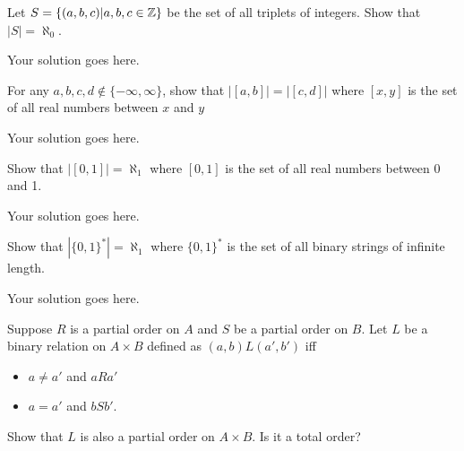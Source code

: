 \documentclass[12pt]{article}
\begin{document}
    \noindent
    
    \onehalfspace

    \begin{question}
        Let $S = \{(a,b,c) | a,b,c \in \mathbb{Z}\}$ be the set of all triplets of integers. Show that $|S| = \aleph_0$.
    \end{question}

    \begin{solution}
        Your solution goes here.
    \end{solution}

    \begin{question}
        For any $a,b,c,d \not \in \{-\infty, \infty\}$, show that $|[a,b]| = |[c,d]|$ where $[x,y]$ is the set of all real numbers between $x$ and $y$
    \end{question}
    \begin{solution}
        Your solution goes here.
    \end{solution}

    \begin{question}
        Show that $|[0,1]| = \aleph_1$ where $[0,1]$ is the set of all real numbers between 0 and 1.
    \end{question}
    
    \begin{solution}
        Your solution goes here.
    \end{solution}

    \begin{question}
        Show that $|\{0,1\}^*| = \aleph_1$ where $\{0,1\}^*$ is the set of all binary strings of infinite length.
    \end{question}
    
    \begin{solution}
        Your solution goes here.
    \end{solution}

    \begin{question}
        Suppose $R$ is a partial order on $A$ and $S$ be a partial order on $B$. Let $L$ be a binary relation on $A \times B$ defined as $(a,b)L(a',b')$ iff
        \begin{itemize}
            \item $a \neq a'$ and $aRa'$
            \item $a = a'$ and $bSb'$.
        \end{itemize}
        Show that $L$ is also a partial order on $A \times B$. Is it a total order?
    \end{question}
\end{document}
